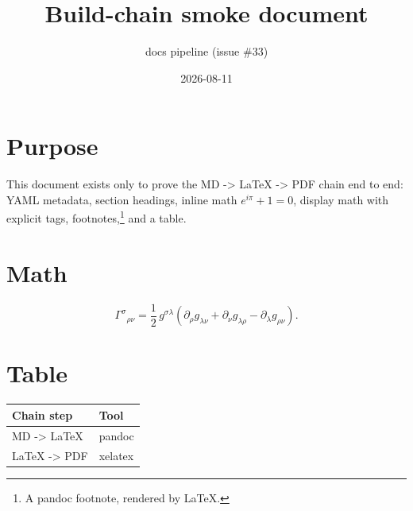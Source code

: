 \documentclass[
]{article}
\title{Build-chain smoke document}
\author{docs pipeline (issue \#33)}
\date{2026-08-11}
\begin{document}
\maketitle

\hypertarget{purpose}{%
\section{Purpose}\label{purpose}}

This document exists only to prove the MD -\textgreater{} LaTeX
-\textgreater{} PDF chain end to end: YAML metadata, section headings,
inline math \(e^{i\pi} + 1 = 0\), display math with explicit tags,
footnotes,\footnote{A pandoc footnote, rendered by LaTeX.} and a table.

\hypertarget{math}{%
\section{Math}\label{math}}

\[\Gamma^{\sigma}{}_{\rho\nu} = \frac{1}{2}\, g^{\sigma\lambda}\left( \partial_{\rho} g_{\lambda\nu} + \partial_{\nu} g_{\lambda\rho} - \partial_{\lambda} g_{\rho\nu} \right). \tag{1}\]

\hypertarget{table}{%
\section{Table}\label{table}}

\begin{longtable}[]{@{}ll@{}}
\toprule\noalign{}
Chain step & Tool \\
\midrule\noalign{}
\endhead
\bottomrule\noalign{}
\endlastfoot
MD -\textgreater{} LaTeX & pandoc \\
LaTeX -\textgreater{} PDF & xelatex \\
\end{longtable}
\end{document}
